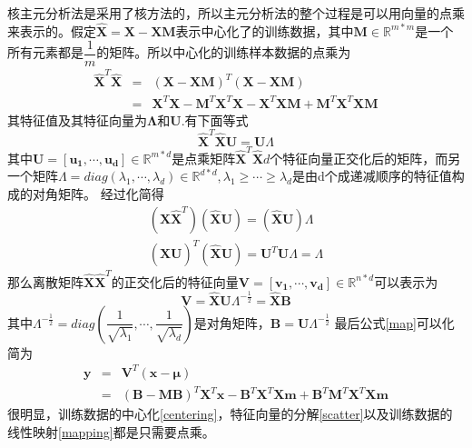 \documentclass[10pt,a4paper]{article}
\begin{document}
\begin{CJK*}{UTF8}{song}
核主元分析法是采用了核方法的，所以主元分析法的整个过程是可以用向量的点乘来表示的。假定$\hat{\mathbf{X}}=\mathbf{X}-\mathbf{X}\mathbf{M}$表示中心化了的训练数据，其中$\mathbf{M} \in \mathbb{R}^{m*m}$是一个所有元素都是$\dfrac{1}{m}$的矩阵。所以中心化的训练样本数据的点乘为
\begin{eqnarray}
\label{centering}
\hat{\mathbf{X}}^T\hat{\mathbf{X}}
&=&(\mathbf{X}-\mathbf{X}\mathbf{M})^T(\mathbf{X}-\mathbf{X}\mathbf{M})\nonumber\\
&=&\mathbf{X}^T\mathbf{X}-\mathbf{M}^T\mathbf{X}^T\mathbf{X}
-\mathbf{X}^T\mathbf{X}\mathbf{M}+\mathbf{M}^T\mathbf{X}^T\mathbf{X}\mathbf{M}
\end{eqnarray}
其特征值及其特征向量为$\mathbf{\Lambda}$和$\mathbf{U}$.有下面等式
\begin{equation}
\hat{\mathbf{X}}^T\hat{\mathbf{X}}\mathbf{U}=\mathbf{U}\Lambda
\end{equation}
其中$\mathbf{U}=[\boldsymbol{u_1},\cdots,\boldsymbol{u_d}] \in \mathbb{R}^{m*d}$是点乘矩阵$\hat{\mathbf{X}}^T\hat{\mathbf{X}}d$个特征向量正交化后的矩阵，而另一个矩阵$\Lambda=diag(\lambda_1,\cdots,\lambda_d) \in \mathbb{R}^{d*d},\lambda_1\geqslant\cdots\geqslant\lambda_d$是由d个成递减顺序的特征值构成的对角矩阵。
经过化简得
\begin{eqnarray}
(\hat{\mathbf{X}}\hat{\mathbf{X}}^T)(\hat{\mathbf{X}}\mathbf{U})
=(\hat{\mathbf{X}}\mathbf{U})\Lambda\\
(\hat{\mathbf{X}}\mathbf{U})^T(\hat{\mathbf{X}}\mathbf{U})=\mathbf{U}^T\mathbf{U}\Lambda=\Lambda
\end{eqnarray}
那么离散矩阵$\hat{\mathbf{X}}\hat{\mathbf{X}}^T$的正交化后的特征向量$\mathbf{V}=[\boldsymbol{v_1},\cdots,\boldsymbol{v_d}] \in \mathbb{R}^{n*d}$可以表示为
\begin{equation}
\label{scatter}
\mathbf{V}=\hat{\mathbf{X}}\mathbf{U}\Lambda^{-\frac{1}{2}}=\hat{\mathbf{X}}\mathbf{B}
\end{equation}
其中$\Lambda^{-\frac{1}{2}}=diag(\dfrac{1}{\sqrt{\lambda_1}},\cdots,\dfrac{1}{\sqrt{\lambda_d}})$是对角矩阵，$\mathbf{B}=\mathbf{U}\Lambda^{-\frac{1}{2}}$
最后公式\ref{map}可以化简为
\begin{eqnarray}
\label{mapping}
\boldsymbol{y}&=&\mathbf{V}^T(\boldsymbol{x}-\boldsymbol{\mu})\nonumber\\
&=&(\mathbf{B}-\mathbf{M}\mathbf{B})^T\mathbf{X}^T\boldsymbol{x}-
\mathbf{B}^T\mathbf{X}^T\mathbf{X}\boldsymbol{m}
+\mathbf{B}^T\mathbf{M}^T\mathbf{X}^T\mathbf{X}\boldsymbol{m}
\end{eqnarray}
很明显，训练数据的中心化\ref{centering}，特征向量的分解\ref{scatter}以及训练数据的线性映射\ref{mapping}都是只需要点乘。


\end{CJK*}
\end{document}
